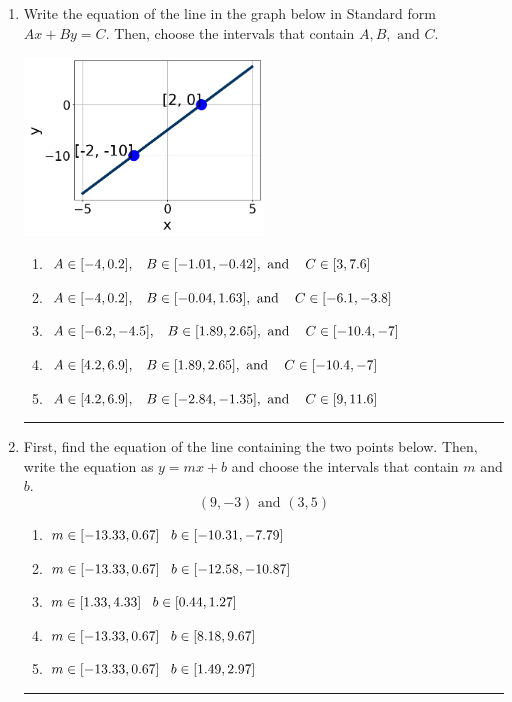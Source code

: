 \documentclass[14pt]{extbook}
\newcommand{\litem}[1]{\item#1\hspace*{-1cm}\rule{\textwidth}{0.4pt}}
\begin{document}
\begin{enumerate}
{\begin{enumerate}[label=\Alph*.]
\end{enumerate} }
\litem{
Write the equation of the line in the graph below in Standard form $Ax+By=C$. Then, choose the intervals that contain $A, B, \text{ and } C$.
\begin{center}
    \includegraphics[width=0.5\textwidth]{../Figures/linearGraphToStandardB.png}
\end{center}
\begin{enumerate}[label=\Alph*.]
\item \( A \in [-4, 0.2], \hspace{3mm} B \in [-1.01, -0.42], \text{ and } \hspace{3mm} C \in [3, 7.6] \)
\item \( A \in [-4, 0.2], \hspace{3mm} B \in [-0.04, 1.63], \text{ and } \hspace{3mm} C \in [-6.1, -3.8] \)
\item \( A \in [-6.2, -4.5], \hspace{3mm} B \in [1.89, 2.65], \text{ and } \hspace{3mm} C \in [-10.4, -7] \)
\item \( A \in [4.2, 6.9], \hspace{3mm} B \in [1.89, 2.65], \text{ and } \hspace{3mm} C \in [-10.4, -7] \)
\item \( A \in [4.2, 6.9], \hspace{3mm} B \in [-2.84, -1.35], \text{ and } \hspace{3mm} C \in [9, 11.6] \)

\end{enumerate} }
\litem{
First, find the equation of the line containing the two points below. Then, write the equation as $ y=mx+b $ and choose the intervals that contain $m$ and $b$.\[ (9, -3) \text{ and } (3, 5) \]\begin{enumerate}[label=\Alph*.]
\item \( m \in [-13.33, 0.67] \hspace*{3mm} b \in [-10.31, -7.79] \)
\item \( m \in [-13.33, 0.67] \hspace*{3mm} b \in [-12.58, -10.87] \)
\item \( m \in [1.33, 4.33] \hspace*{3mm} b \in [0.44, 1.27] \)
\item \( m \in [-13.33, 0.67] \hspace*{3mm} b \in [8.18, 9.67] \)
\item \( m \in [-13.33, 0.67] \hspace*{3mm} b \in [1.49, 2.97] \)


\end{enumerate}}
\end{enumerate}
\end{document}
